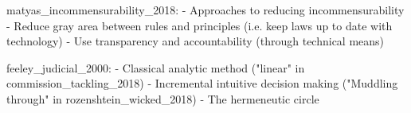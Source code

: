 matyas_incommensurability_2018:
- Approaches to reducing incommensurability
  - Reduce gray area between rules and principles (i.e. keep laws up to date with technology)
  - Use transparency and accountability (through technical means)

feeley_judicial_2000:
- Classical analytic method ("linear" in commission_tackling_2018)
- Incremental intuitive decision making ("Muddling through" in rozenshtein_wicked_2018)
- The hermeneutic circle


















